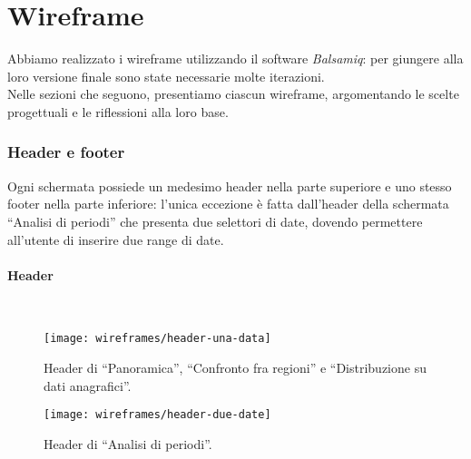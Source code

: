 \documentclass[../../../main.tex]{subfiles}
\begin{document}
\section{Wireframe}\label{s:wireframe}
Abbiamo realizzato i wireframe utilizzando il software \textit{Balsamiq}: per giungere alla loro versione finale sono state necessarie molte iterazioni.\\
Nelle sezioni che seguono, presentiamo ciascun wireframe, argomentando le scelte progettuali e le riflessioni alla loro base.

\subsubsection{Header e footer}\label{ss:header-e-footer}
Ogni schermata possiede un medesimo header nella parte superiore e uno stesso footer nella parte inferiore: l'unica eccezione è fatta dall'header della schermata ``Analisi di periodi'' che presenta due selettori di date, dovendo permettere all'utente di inserire due range di date.

\paragraph{Header}\mbox{}\\
\begin{figure}[H]
    \centering
    \texttt{[image: wireframes/header-una-data]}
    \caption{Header di ``Panoramica'', ``Confronto fra regioni'' e ``Distribuzione su dati anagrafici''.}
    \label{fig:header-una-data}
\end{figure}

\begin{figure}[H]
    \centering
    \texttt{[image: wireframes/header-due-date]}
    \caption{Header di ``Analisi di periodi''.}
    \label{fig:header-due-date}
\end{figure}
\end{document}
